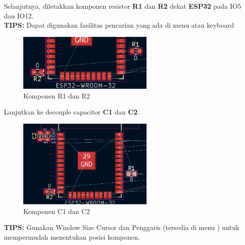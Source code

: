 \documentclass[12pt]{book}
\begin{document}
	\newpage
	Selanjutnya, diletakkan komponen resistor \textbf{R1} dan \textbf{R2} dekat \textbf{ESP32} pada IO5 dan IO12.\\

	\textbf{TIPS:} Dapat digunakan fasilitas pencarian yang ada di menu  atau keyboard 

	\begin{figure}[!ht]
		\centering
		\includegraphics[width=0.6\textwidth]{images/pcb/pcb_5}
		\caption{Komponen R1 dan R2}
	\end{figure}

	Lanjutkan ke decouple capacitor \textbf{C1} dan \textbf{C2}.

	\begin{figure}[!ht]
		\centering
		\includegraphics[width=0.6\textwidth]{images/pcb/pcb_6}
		\caption{Komponen C1 dan C2}
	\end{figure}

	\textbf{TIPS:} Gunakan Window Size Cursor dan Penggaris (tersedia di menu ) untuk mempermudah menentukan posisi komponen.
\end{document}
